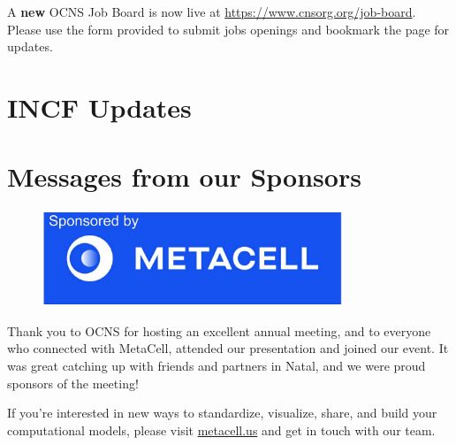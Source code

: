 \documentclass[11pt,a4paper,oneside]{article}
\begin{document}
A \textbf{new} OCNS Job Board is now live at \url{https://www.cnsorg.org/job-board}.
Please use the form provided to submit jobs openings and bookmark the page for updates.


\clearpage
\section*{INCF Updates}%
\lipsum[1-3]

\clearpage

\clearpage

\clearpage
\section*{Messages from our Sponsors}%
\sectionauthor{\vspace{-3ex}}
\begin{figure}[!h]
  \centering
  \includegraphics[width=0.8\textwidth]{images/Metacel_logo_2_crop}
\end{figure}

Thank you to OCNS for hosting an excellent annual meeting, and to everyone who connected with MetaCell, attended our presentation and joined our event.
It was great catching up with friends and partners in Natal, and we were proud sponsors of the meeting!

If you're interested in new ways to standardize, visualize, share, and build your computational models, please visit \url{metacell.us} and get in touch with our team.

\clearpage
\end{document}
